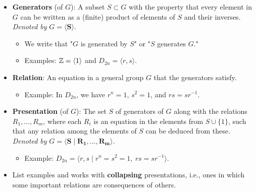 \documentclass[../main.tex]{subfiles}
\begin{document}
\begin{itemize}
    \item \textbf{Generators} (of $G$): A subset $S\subset G$ with the property that every element in $G$ can be written as a (finite) product of elements of $S$ and their inverses. \emph{Denoted by} $G=\bm{\langle S\rangle}$.
    \begin{itemize}
        \item We write that "$G$ is generated by $S$" or "$S$ generates $G$."
        \item Examples: $\mathbb{Z}=\langle 1\rangle$ and $D_{2n}=\langle r,s\rangle$.
    \end{itemize}
    \item \textbf{Relation}: An equation in a general group $G$ that the generators satisfy.
    \begin{itemize}
        \item Example: In $D_{2n}$, we have $r^n=1$, $s^2=1$, and $rs=sr^{-1}$.
    \end{itemize}
    \item \textbf{Presentation} (of $G$): The set $S$ of generators of $G$ along with the relations $R_1,\dots,R_m$, where each $R_i$ is an equation in the elements from $S\cup\{1\}$, such that any relation among the elements of $S$ can be deduced from these. \emph{Denoted by} $G=\bm{\langle S\mid R_1,...,R_m\rangle}$.
    \begin{itemize}
        \item Example: $D_{2n}=\langle r,s\mid r^n=s^2=1,\ rs=sr^{-1}\rangle$.
    \end{itemize}
    \item List examples and works with \textbf{collapsing} presentations, i.e., ones in which some important relations are consequences of others.
\end{itemize}
\end{document}
